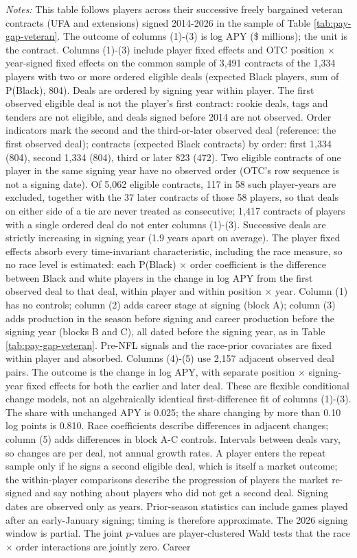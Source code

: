 {\footnotesize
\noindent\textit{Notes:} This table follows players across their successive freely bargained veteran contracts (UFA and extensions) signed 2014-2026 in the sample of Table \ref{tab:pay-gap-veteran}. The outcome of columns (1)-(3) is log APY (\$ millions); the unit is the contract. Columns (1)-(3) include player fixed effects and OTC position $\times$ year-signed fixed effects on the common sample of 3,491 contracts of the 1,334 players with two or more ordered eligible deals (expected Black players, sum of P(Black), 804). Deals are ordered by signing year within player. The first observed eligible deal is not the player's first contract: rookie deals, tags and tenders are not eligible, and deals signed before 2014 are not observed. Order indicators mark the second and the third-or-later observed deal (reference: the first observed deal); contracts (expected Black contracts) by order: first 1,334 (804), second 1,334 (804), third or later 823 (472). Two eligible contracts of one player in the same signing year have no observed order (OTC's row sequence is not a signing date). Of 5,062 eligible contracts, 117 in 58 such player-years are excluded, together with the 37 later contracts of those 58 players, so that deals on either side of a tie are never treated as consecutive; 1,417 contracts of players with a single ordered deal do not enter columns (1)-(3). Successive deals are strictly increasing in signing year (1.9 years apart on average). The player fixed effects absorb every time-invariant characteristic, including the race measure, so no race level is estimated: each P(Black) $\times$ order coefficient is the difference between Black and white players in the change in log APY from the first observed deal to that deal, within player and within position $\times$ year. Column (1) has no controls; column (2) adds career stage at signing (block A); column (3) adds production in the season before signing and career production before the signing year (blocks B and C), all dated before the signing year, as in Table \ref{tab:pay-gap-veteran}. Pre-NFL signals and the race-prior covariates are fixed within player and absorbed. Columns (4)-(5) use 2,157 adjacent observed deal pairs. The outcome is the change in log APY, with separate position $\times$ signing-year fixed effects for both the earlier and later deal. These are flexible conditional change models, not an algebraically identical first-difference fit of columns (1)-(3). The share with unchanged APY is 0.025; the share changing by more than 0.10 log points is 0.810. Race coefficients describe differences in adjacent changes; column (5) adds differences in block A-C controls. Intervals between deals vary, so changes are per deal, not annual growth rates. A player enters the repeat sample only if he signs a second eligible deal, which is itself a market outcome; the within-player comparisons describe the progression of players the market re-signed and say nothing about players who did not get a second deal. Signing dates are observed only as years. Prior-season statistics can include games played after an early-January signing; timing is therefore approximate. The 2026 signing window is partial. The joint $p$-values are player-clustered Wald tests that the race $\times$ order interactions are jointly zero. Career }
